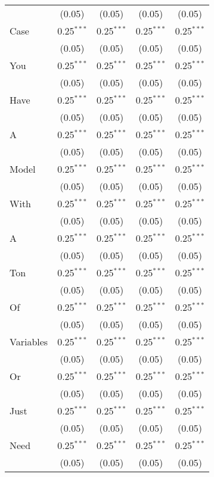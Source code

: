 \begin{spacing}{1}
{\begin{longtable}{lcccc}
 			&	(0.05)	&	(0.05)	&	(0.05)	&	(0.05) \\	 
 			Case & 0.25$^{***}$ & 0.25$^{***}$ & 0.25$^{***}$ & 0.25$^{***}$ \\
 			&	(0.05)	&	(0.05)	&	(0.05)	&	(0.05) \\	 
 			You & 0.25$^{***}$ & 0.25$^{***}$ & 0.25$^{***}$ & 0.25$^{***}$ \\
 			&	(0.05)	&	(0.05)	&	(0.05)	&	(0.05) \\	 
 			Have & 0.25$^{***}$ & 0.25$^{***}$ & 0.25$^{***}$ & 0.25$^{***}$ \\
 			&	(0.05)	&	(0.05)	&	(0.05)	&	(0.05) \\	 
 			A & 0.25$^{***}$ & 0.25$^{***}$ & 0.25$^{***}$ & 0.25$^{***}$ \\
 			&	(0.05)	&	(0.05)	&	(0.05)	&	(0.05) \\	 
 			Model & 0.25$^{***}$ & 0.25$^{***}$ & 0.25$^{***}$ & 0.25$^{***}$ \\
 			&	(0.05)	&	(0.05)	&	(0.05)	&	(0.05) \\	 
 			With & 0.25$^{***}$ & 0.25$^{***}$ & 0.25$^{***}$ & 0.25$^{***}$ \\
 			&	(0.05)	&	(0.05)	&	(0.05)	&	(0.05) \\	 
 			A & 0.25$^{***}$ & 0.25$^{***}$ & 0.25$^{***}$ & 0.25$^{***}$ \\
 			&	(0.05)	&	(0.05)	&	(0.05)	&	(0.05) \\	 
 			Ton & 0.25$^{***}$ & 0.25$^{***}$ & 0.25$^{***}$ & 0.25$^{***}$ \\
 			&	(0.05)	&	(0.05)	&	(0.05)	&	(0.05) \\	 
 			Of & 0.25$^{***}$ & 0.25$^{***}$ & 0.25$^{***}$ & 0.25$^{***}$ \\
 			&	(0.05)	&	(0.05)	&	(0.05)	&	(0.05) \\	 
 			Variables & 0.25$^{***}$ & 0.25$^{***}$ & 0.25$^{***}$ & 0.25$^{***}$ \\
 			&	(0.05)	&	(0.05)	&	(0.05)	&	(0.05) \\	 
 			Or & 0.25$^{***}$ & 0.25$^{***}$ & 0.25$^{***}$ & 0.25$^{***}$ \\
 			&	(0.05)	&	(0.05)	&	(0.05)	&	(0.05) \\	 
 			Just & 0.25$^{***}$ & 0.25$^{***}$ & 0.25$^{***}$ & 0.25$^{***}$ \\
 			&	(0.05)	&	(0.05)	&	(0.05)	&	(0.05) \\	 
 			Need & 0.25$^{***}$ & 0.25$^{***}$ & 0.25$^{***}$ & 0.25$^{***}$ \\
 			&	(0.05)	&	(0.05)	&	(0.05)	&	(0.05) \\	 	

\end{longtable}}
\end{spacing}
